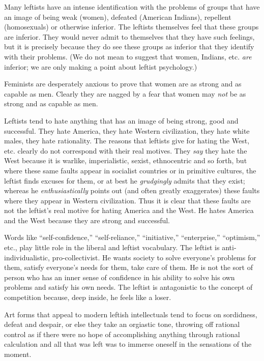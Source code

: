  Many leftists have an intense identification with the problems of groups that have an image of being weak (women), defeated (American Indians), repellent (homosexuals) or otherwise inferior. The leftists themselves feel that these groups are inferior. They would never admit to themselves that they have such feelings, but it is precisely because they do see these groups as inferior that they identify with their problems. (We do not mean to suggest that women, Indians, etc. {\em are} inferior; we are only making a point about leftist psychology.)

 Feminists are desperately anxious to prove that women are as strong and as capable as men. Clearly they are nagged by a fear that women may {\em not} be as strong and as capable as men.

 Leftists tend to hate anything that has an image of being strong, good and successful. They hate America, they hate Western civilization, they hate white males, they hate rationality. The reasons that leftists give for hating the West, etc. clearly do not correspond with their real motives. They {\em say} they hate the West because it is warlike, imperialistic, sexist, ethnocentric and so forth, but where these same faults appear in socialist countries or in primitive cultures, the leftist finds excuses for them, or at best he {\em grudgingly} admits that they exist; whereas he {\em enthusiastically} points out (and often greatly exaggerates) these faults where they appear in Western civilization. Thus it is clear that these faults are not the leftist’s real motive for hating America and the West. He hates America and the West because they are strong and successful.

 Words like “self-confidence,” “self-reliance,” “initiative,” “enterprise,” “optimism,” etc., play little role in the liberal and leftist vocabulary. The leftist is anti-individualistic, pro-collectivist. He wants society to solve everyone’s problems for them, satisfy everyone’s needs for them, take care of them. He is not the sort of person who has an inner sense of confidence in his ability to solve his own problems and satisfy his own needs. The leftist is antagonistic to the concept of competition because, deep inside, he feels like a loser.

 Art forms that appeal to modern leftish intellectuals tend to focus on sordidness, defeat and despair, or else they take an orgiastic tone, throwing off rational control as if there were no hope of accomplishing anything through rational calculation and all that was left was to immerse oneself in the sensations of the moment.

